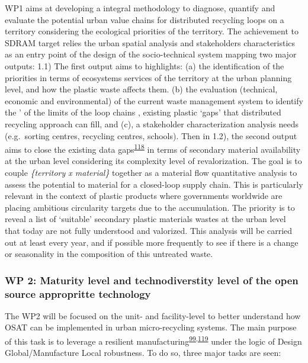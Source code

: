 \documentclass[
  11pt,
  a4paperpaper,
  onecolumn]{article}
\begin{document}
WP1 aims at developing a integral methodology to diagnose, quantify and
evaluate the potential urban value chains for distributed recycling
loops on a territory considering the ecological priorities of the
territory. The achievement to SDRAM target relies the urban spatial
analysis and stakeholders characteristics as an entry point of the
design of the socio-technical system mapping two major outputs: 1.1) The
first output aims to highlights: (a) the identification of the
priorities in terms of ecosystems services of the territory at the urban
planning level, and how the plastic waste affects them. (b) the
evaluation (technical, economic and environmental) of the current waste
management system to identify the ' of the limits of the loop chains ,
existing plastic `gaps' that distributed recycling approach can fill,
and (c), a stakeholder characterization analysis needs (e.g.~sorting
centres, recycling centres, schools). Then in 1.2), the second output
aims to close the existing data
gaps\textsuperscript{\protect\hyperlink{ref-Bianchi2020}{118}} in terms
of secondary material availability at the urban level considering its
complexity level of revalorization. The goal is to couple
\emph{\{territory x material\}} together as a material flow quantitative
analysis to assess the potential to material for a closed-loop supply
chain. This is particularly relevant in the context of plastic products
where governments worldwide are placing ambitious circularity targets
due to the accumulation. The priority is to reveal a list of `suitable'
secondary plastic materials wastes at the urban level that today are not
fully understood and valorized. This analysis will be carried out at
least every year, and if possible more frequently to see if there is a
change or seasonality in the composition of this untreated waste.

\hypertarget{wp-2-maturity-level-and-technodiverstity-level-of-the-open-source-appropritte-technology}{%
\subsubsection{WP 2: Maturity level and technodiverstity level of the
open source appropritte
technology}\label{wp-2-maturity-level-and-technodiverstity-level-of-the-open-source-appropritte-technology}}

The WP2 will be focused on the unit- and facility-level to better
understand how OSAT can be implemented in urban micro-recycling systems.
The main purpose of this task is to leverage a resilient
manufacturing\textsuperscript{\protect\hyperlink{ref-xu2021e}{99},\protect\hyperlink{ref-zhang2011}{119}}
under the logic of Design Global/Manufacture Local robustness. To do so,
three major tasks are seen:
\end{document}
